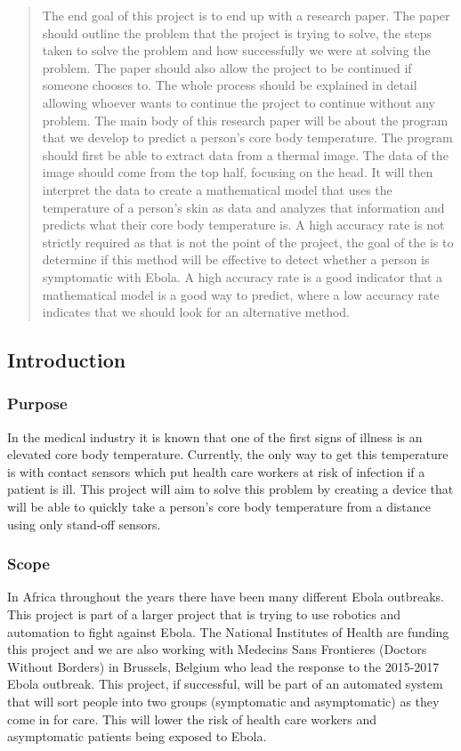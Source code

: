 \begin{abstract}
	The end goal of this project is to end up with a research paper. The paper should outline the problem that the project is trying to solve, the steps taken to solve the problem and how successfully we were
	at solving the problem. The paper should also allow the project to be continued if someone chooses to. The whole process should be explained in detail allowing whoever wants to continue the
	project to continue without any problem. The main body of this research paper will be about the program that we develop to predict a person's core body temperature. The program should first be able to
	extract data from a thermal image. The data of the image should come from the top half, focusing on the head. It will then interpret the data to create a mathematical model that uses the temperature of a 
	person's skin as data and analyzes that information and predicts what their core body temperature is. A high accuracy rate is not strictly required as that is not the point of the project, 
	the goal of the is to determine if this method will be effective to detect whether a person is symptomatic with Ebola. A high accuracy rate is a good indicator that a mathematical model
	is a good way to predict, where a low accuracy rate indicates that we should look for an alternative method.
\end{abstract}

\subsection*{Introduction}
	\subsubsection*{Purpose}
	In the medical industry it is known that one of the first signs of illness is an elevated core body temperature. Currently, the only way to get this temperature is with contact sensors which put health care workers at risk of infection if a patient is ill. This project will aim to solve this problem by creating a device that will be able to quickly take a person's core body temperature from a distance using only stand-off sensors.
	\subsubsection*{Scope}
	In Africa throughout the years there have been many different Ebola outbreaks. This project is part of a larger project that is trying to use robotics and automation to fight against Ebola. The National Institutes of Health are funding this project and we are also working with Medecins Sans Frontieres (Doctors Without Borders) in Brussels, Belgium who lead the response to the 2015-2017 Ebola outbreak. 
	This project, if successful, will be part of an automated system that will sort people into two groups (symptomatic and asymptomatic) as they come in for care. This will lower the risk of health care workers and asymptomatic patients being exposed to Ebola. 
